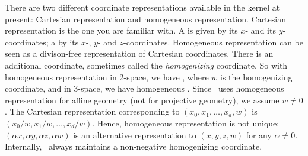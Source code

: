 There are two different coordinate representations%
%
available in the
kernel at present: Cartesian representation and homogeneous
representation. Cartesian representation%
%
%
%
is the one you are familiar with. 
A  is given by its $x$- and its $y$-coordinates;%
a  by its $x$-, $y$- and $z$-coordinates.
Homogeneous representation
%
%
%
can be seen as a divison-free representation
of Cartesian coordinates. There is an additional coordinate, sometimes called
the {\em homogenizing} coordinate.%
So with homogeneous representation in
2-space, 
we have , where $w$ is the homogenizing coordinate,
and in 3-space, 
we have homogeneous .
Since \cgal\ uses homogeneous representation for affine geometry (not for
projective geometry), we assume $w \neq 0$.
The Cartesian representation corresponding to $(x_0, x_1, \ldots, x_d, w)$
is $(x_0/w, x_1/w, \ldots, x_d/w)$. Hence, homogeneous representation
is not unique; $(\alpha x,\alpha y,\alpha z,\alpha w)$ is an alternative
representation to $(x,y,z,w)$ for any $\alpha \neq 0$.
Internally, \cgal\ always maintains a non-negative homogenizing coordinate.

